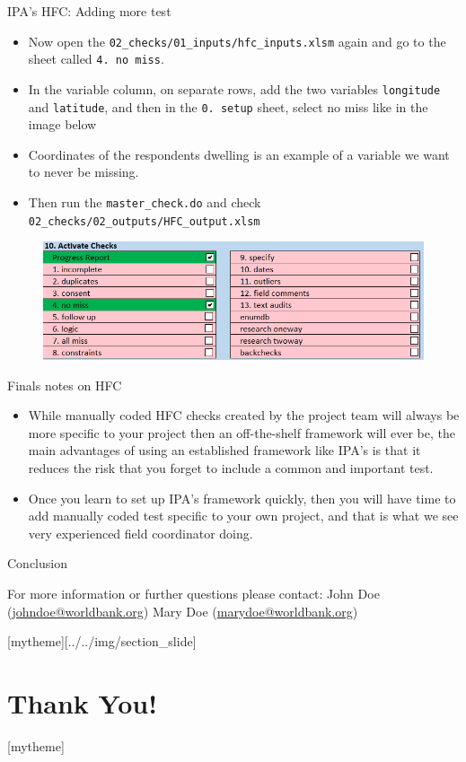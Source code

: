\documentclass[aspectratio=169]{beamer}
\newcommand{\sectionpic}[2]{
	\setbeamertemplate{section page}[mytheme][#2]
	\section{#1}
	\setbeamertemplate{section page}[mytheme]
}
\begin{document}
\begin{frame}{IPA's HFC: Adding more test}

	\begin{itemize}
		\item \small Now open the \texttt{02\_checks/01\_inputs/hfc\_inputs.xlsm} again and go to the sheet called \texttt{4. no miss}.
		\item \small In the variable column, on separate rows, add the two variables \texttt{longitude} and \texttt{latitude}, and then in the \texttt{0. setup} sheet, select no miss like in the image below
		\item \small Coordinates of the respondents dwelling is an example of a variable we want to never be missing.
		\item Then run the \texttt{master\_check.do} and check \texttt{02\_checks/02\_outputs/HFC\_output.xlsm} 
	\end{itemize}

	\begin{figure}
		\centering
		\includegraphics[width=.75\linewidth]{img/ipacheck-setup-nomiss.png}
	\end{figure}
\end{frame}


\begin{frame}{Finals notes on HFC}
	\begin{itemize}
		\item While manually coded HFC checks created by the project team will always be more specific to your project then an off-the-shelf framework will ever be, the main advantages of using an established framework like IPA's is that it reduces the risk that you forget to include a common and important test.
		\item Once you learn to set up IPA's framework quickly, then you will have time to add manually coded test specific to your own project, and that is what we see very experienced field coordinator doing.
	\end{itemize}
\end{frame}

\begin{frame}{Conclusion}


\vspace{20mm}
For more information or further questions please contact:
\newline John Doe (\url{johndoe@worldbank.org}) \newline Mary Doe (\url{marydoe@worldbank.org})

\end{frame}

\sectionpic{Thank You!}{../../img/section_slide}
\end{document}
